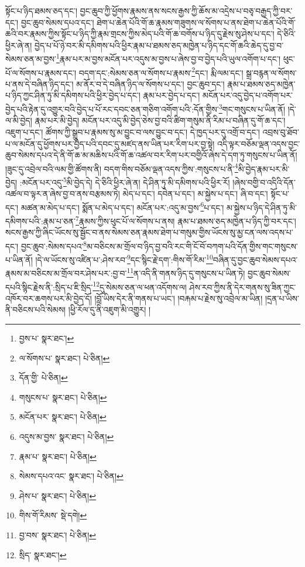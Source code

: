 སྟོང་པ་ཉིད་ཐམས་ཅད་དང་། བྱང་ཆུབ་ཀྱི་ཕྱོགས་རྣམས་ནས་སངས་རྒྱས་ཀྱི་ཆོས་མ་འདྲེས་པ་བཅྭ་བརྒྱད་ཀྱི་བར་དང་། བྱང་ཆུབ་སེམས་དཔའ་དང་། ཐེག་པ་ཆེན་པོའི་གོ་ཆ་རྣམས་གཟུགས་ལ་སོགས་པ་ནས་ཐེག་པ་ཆེན་པོའི་གོ་ཆའི་བར་རྣམས་ཀྱིས་སྟོང་པ་ཉིད་ཀྱི་རྣམ་གྲངས་ཀྱིས་མེད་པའི་གོ་ཆ་བགོས་པ་ཉིད་དུ་རྗེས་སུ་ཤེས་པ་དང་། དེ་ཅིའི་ཕྱིར་ཞེ་ན། བྱེད་པ་པོ་ཉེ་བར་མི་དམིགས་པའི་ཕྱིར་རྣམ་པ་ཐམས་ཅད་མཁྱེན་པ་ཉིད་དང་གོ་ཆའི་ཆེད་དུ་བྱ་བ་སེམས་ཅན་མ་བྱས་\footnote{བྱས་པ་  སྣར་ཐང་། }རྣམ་པར་མ་བྱས་མངོན་པར་འདུས་མ་བྱས་པ་ཞེས་བྱ་བ་བྱེད་པའི་ཡུལ་འགོག་པ་དང་། ཕུང་པོ་ལ་སོགས་པ་རྣམས་དང་། བདག་དང་:སེམས་ཅན་ལ་སོགས་པ་རྣམས་\footnote{ལ་སོགས་པ་  སྣར་ཐང་།  པེ་ཅིན། }དང་། རྨི་ལམ་དང་། སྒྲ་བརྙན་ལ་སོགས་པ་ནས་དེ་བཞིན་ཉིད་དང་། མ་ནོར་བ་དེ་བཞིན་ཉིད་ལ་སོགས་པ་དང་། བྱང་ཆུབ་དང་། རྣམ་པ་ཐམས་ཅད་མཁྱེན་པ་ཉིད་ཀྱང་ཤིན་ཏུ་མི་དམིགས་པའི་ཕྱིར་བྱེད་པ་དང་། རྣམ་པར་བྱེད་པ་དང་། མངོན་པར་འདུ་བྱེད་པ་འགོག་པར་བྱེད་པའི་རྟེན་དུ་འགྱུར་བའི་བྱེད་པ་པོ་རང་དབང་ཅན་གཅིག་འགོག་པའི་:དོན་གྱིས་\footnote{དོན་གྱི་  པེ་ཅིན། }གང་གསུངས་པ་ཡིན་ནོ། །དེ་ལ་མི་བྱེད། རྣམ་པར་མི་བྱེད། མངོན་པར་འདུ་མི་བྱེད་ཅེས་བྱ་བའི་ཚིག་གསུམ་ནི་རིམ་པ་བཞིན་དུ་གོ་ཆ་དང་། འཇུག་པ་དང་། ཚོགས་ཀྱི་སྒྲུབ་པ་རྣམས་སུ་མ་བྱུང་བ་ལས་བྱུང་བ་དང་། དེ་ཁྱད་པར་དུ་འགྲོ་བ་དང་། འབྲས་བུ་ཐོབ་པ་ལ་མངོན་དུ་ཕྱོགས་པར་བྱེད་པའི་དབང་དུ་མཛད་ནས་ཡིན་པར་རིག་པར་བྱ་སྟེ། འདི་ལྟར་བཅོམ་ལྡན་འདས་བྱང་ཆུབ་སེམས་དཔའ་དེ་ནི་གོ་ཆ་མ་མཆིས་པའི་གོ་ཆ་འཚལ་བར་རིག་པར་བགྱིའོ་ཞེས་དེ་དག་ཏུ་གསུངས་པ་ཡིན་ནོ། །ཟུང་དུ་འབྲེལ་བའི་ལམ་གྱི་ཚོགས་ནི། བདག་གིས་བཅོམ་ལྡན་འདས་ཀྱིས་:གསུངས་པ་ནི་\footnote{གསུངས་པ་  སྣར་ཐང་།  པེ་ཅིན། }མི་བྱེད་རྣམ་པར་མི་བྱེད། :མངོན་པར་འདུ་\footnote{མངོན་པར་  སྣར་ཐང་།  པེ་ཅིན། }མི་བྱེད་དེ། དེ་ཅིའི་ཕྱིར་ཞེ་ན། དེ་ཤིན་ཏུ་མི་དམིགས་པའི་ཕྱིར་རོ། །ཞེས་བགྱི་བ་འདིའི་དོན་འཚལ་བ་ལྟར་ན་ཞེས་བྱ་བ་ནས་བརྩམས་ཏེ། མེད་པ་དང་། དབེན་པ་དང་། མ་སྐྱེས་པ་དང་། ཞི་བ་དང་། སྟོང་པ་དང་། མཚན་མ་མེད་པ་དང་། སྨོན་པ་མེད་པ་དང་། མངོན་པར་:འདུ་མ་བྱས་\footnote{འདུས་མ་བྱས་  སྣར་ཐང་།  པེ་ཅིན། }པ་དང་། མ་སྐྱེས་པ་ཉིད་དེ་ཤིན་ཏུ་མི་དམིགས་པའི་:རྣམ་པ་ཅན་\footnote{རྣམ་པ་  སྣར་ཐང་།  པེ་ཅིན། }རྣམས་ཀྱིས་ཕུང་པོ་ལ་སོགས་པ་ནས། རྣམ་པ་ཐམས་ཅད་མཁྱེན་པ་ཉིད་ཀྱི་བར་དང་། སངས་རྒྱས་ཀྱི་ཞིང་ཡོངས་སུ་སྦྱོང་བ་ནས་སེམས་ཅན་རྣམས་ཐེག་པ་གསུམ་གྱིས་ཡོངས་སུ་མྱ་ངན་ལས་འདས་པ་དང་། བྱང་ཆུབ་:སེམས་དཔའ་\footnote{སེམས་དཔའ་འང་  སྣར་ཐང་།  པེ་ཅིན། }མ་བཅིངས་མ་གྲོལ་བ་ཉིད་བྱ་བའི་རང་གི་ངོ་བོ་བཀག་པའི་དོན་གྱིས་གང་གསུངས་པ་ཡིན་ནོ། །དེ་ལ་ཡོངས་སུ་འཛིན་པ་:ཤེས་རབ་\footnote{ཤེས་པ་  སྣར་ཐང་།  པེ་ཅིན། }དང་སྙིང་རྗེ་དག་:གིས་གོ་རིམ་\footnote{གིས་གོ་རིམས་  སྡེ་དགེ། }བཞིན་དུ་བྱང་ཆུབ་སེམས་དཔའ་རྣམས་མ་བཅིངས་མ་གྲོལ་བར་ཤེས་པར་:བྱ་བ་\footnote{བྱ་བས་  སྣར་ཐང་།  པེ་ཅིན། }ན་འདི་ནི་གནས་ཉིད་དུ་གསུངས་པ་ཡིན་ཏེ། བྱང་ཆུབ་སེམས་དཔའི་སྙིང་རྗེས་ནི་:སྲིད་པ་ཇི་སྲིད་\footnote{སྲིད་  སྣར་ཐང་། }དུ་སེམས་ཅན་ལ་ཕན་འདོགས་ལ། ཤེས་རབ་ཀྱིས་ནི་དེར་གནས་སུ་ཟིན་ཀྱང་འཁོར་བར་ཆགས་པར་མི་བྱེད་དོ། །བློ་ཡིས་དེར་ནི་གནས་པ་ཡང་། །བརྐམ་པ་རྗེས་སུ་འབྲེལ་མ་ཡིན། །དྲན་པ་ཡིས་ནི་བཅིངས་པའི་སེམས། །ཕྱི་རོལ་དུ་ནི་འཇུག་མི་འགྱུར། །
